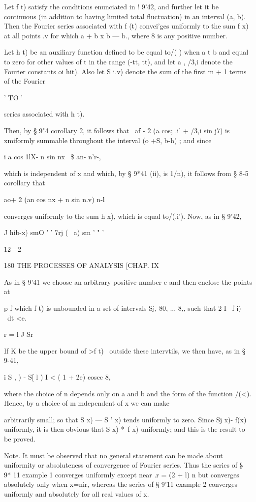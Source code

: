 Let f t) satisfy the conditions enunciated in ! 9'42, and further let
it be continuous (in addition to having limited total fluctuation) in
an interval (a, b). Then the Fourier series associated with f (t)
convei'ges uniformly to the sum f x) at all points .v for which a + b
x b — b., where 8 is any positive number.

Let h t) be an auxiliary function defined to be equal to/( ) when a t
b and equal to zero for other values of t in the range (-tt, tt), and
let a , /3,i denote the Fourier constants oi hit). Also let S i.v)
denote the sum of the first m + 1 terms of the Fourier

  ' TO '

series associated with h t).

Then, by § 9"4 corollary 2, it follows that \ af - 2 (a cos; .i' +
/3,i sin j7) is xmiformly summable throughout the interval (o +S, b-h)
; and since

i a cos 1lX- n sin nx \ \$ an- n'r-,

which is independent of x and which, by § 9*41 (ii), is 1/n), it
follows from § 8-5 corollary that

 ao+ 2 (an cos nx + n sin n.v) n-l

converges uniformly to the sum h x), which is equal to/(.i'). Now, as
in § 9'42,

   J hib-x) smO ' ' 7rj ( \ a) sm ' " '

12—2

180 THE PROCESSES OF ANALYSIS [CHAP. IX

As in § 9'41 we choose an arbitrary positive number e and then enclose
the points at

p f which f t) is unbounded in a set of intervals Sj, 80, ... 8,, such
that 2 I \ f i) \ dt <e.

r = l J Sr

If K be the upper bound of >f t) \ outside these intervtils, we then
have, as in § 9-41,

i S , ) - S[ l ) I < ( 1 + 2e) cosec 8,

where the choice of n depends only on a and b and the form of the
function /(<). Hence, by a choice of m mdependent of x we can make

arbitrarily small; so that S x) — S ' x) tends uniformly to zero.
Since Sj x)- f(x) uniformly, it is then obvious that S x)-*~f x)
uniformly; and this is the result to be proved.

Note. It must be observed that no general statement can be made about
uniformity or absoluteness of convergence of Fourier series. Thus the
series of § 9* 11 example 1 converges uniformly except near .r = (2 +
l) n but converges absolutely only when x=nir, whereas the series of §
9'11 example 2 converges uniformly and absolutely for all real values
of x.

